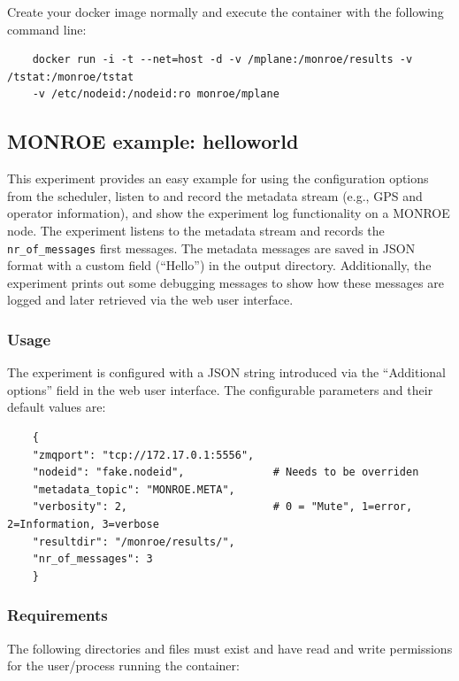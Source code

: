 \documentclass[a4paper,10pt]{article}
\newcommand{\VerbatimFont}{\footnotesize}
\newcommand{\monroe}{MONROE}
\newcommand{\identifier}[1]{{\texttt{\small{#1}}}}
\begin{document}
Create your docker image normally and execute the container with the following command line:

{\VerbatimFont
	\begin{verbatim}
	docker run -i -t --net=host -d -v /mplane:/monroe/results -v /tstat:/monroe/tstat
	-v /etc/nodeid:/nodeid:ro monroe/mplane
	\end{verbatim}}


\subsection{\monroe{} example: helloworld}

This experiment provides an easy example for using the configuration options from the scheduler, listen to and record the metadata stream (e.g., GPS and operator information), and show the experiment log functionality on a \monroe{} node.
The experiment listens to the metadata stream and records the \identifier{nr\_of\_messages} first messages.
The metadata messages are saved in JSON format with a custom field (``Hello'') in the output directory.
Additionally, the experiment prints out some debugging messages to show how these messages are logged and later retrieved via the web user interface.

\subsubsection{Usage}
\label{subsubsec:helloworldUsage}

The experiment is configured with a JSON string introduced via the ``Additional options'' field in the web user interface.
The configurable parameters and their default values are:

{\VerbatimFont
	\begin{verbatim}
	{
	"zmqport": "tcp://172.17.0.1:5556",
	"nodeid": "fake.nodeid",              # Needs to be overriden
	"metadata_topic": "MONROE.META",
	"verbosity": 2,                       # 0 = "Mute", 1=error, 2=Information, 3=verbose
	"resultdir": "/monroe/results/",
	"nr_of_messages": 3
	}
	\end{verbatim}}

\subsubsection{Requirements}

The following directories and files must exist and have read and write permissions for the user/process running the container:
\end{document}
